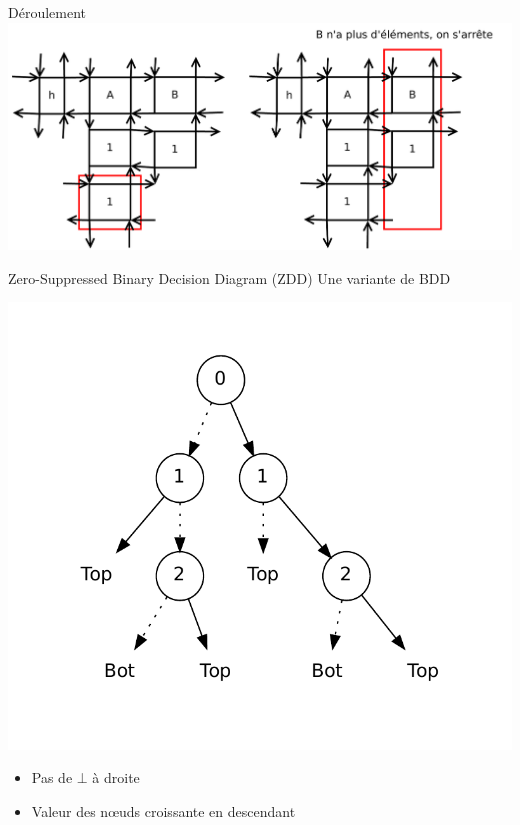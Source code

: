 \documentclass{beamer}
\begin{document}
\begin{frame}{Déroulement}
\includegraphics[scale=0.30]{../imports/second_iter.pdf}
\end{frame}

\begin{frame}{Zero-Suppressed Binary Decision Diagram (ZDD)}
Une variante de BDD\\

\begin{center}
\includegraphics[scale=0.3]{../imports/zdd_ex.pdf}
\end{center}
\begin{itemize}
\item Pas de $\bot$ à droite
\item Valeur des n\oe uds croissante en descendant
\end{itemize} 
\end{frame}
\end{document}
